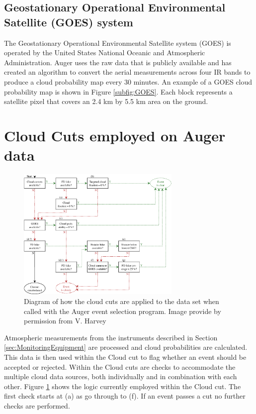 \subsection{Geostationary Operational Environmental Satellite (GOES) system}

The Geostationary Operational Environmental Satellite system (GOES) is operated by the United States National Oceanic and Atmospheric Administration. Auger uses the raw data that is publicly available and has created an algorithm to convert the aerial measurements across four IR bands to produce a cloud probability map every 30 minutes. An example of a GOES cloud probability map is shown in Figure \ref{subfig:GOES}. Each block represents a satellite pixel that covers an 2.4 km by 5.5 km area on the ground.

\section{Cloud Cuts employed on Auger data}

\begin{figure}[!t]
\centering
\includegraphics[width=0.7\textwidth]{chapters/graphs/CloudFlags/cloud_cuts.pdf}
\caption{Diagram of how the cloud cuts are applied to the data set when called with the Auger event selection program. Image provide by permission from V. Harvey} \label{fig:Cloud_Cut_Logic}
\end{figure}

Atmospheric measurements from the instruments described in Section \ref{sec:MonitoringEquipment} are processed and cloud probabilities are calculated. This data is then used within the Cloud cut to flag whether an event should be accepted or rejected. Within the Cloud cuts are checks to accommodate the multiple cloud data sources, both individually and in combination with each other. Figure \ref{fig:Cloud_Cut_Logic} shows the logic currently employed within the Cloud cut. The first check starts at (a) as go through to (f).  If an event passes a cut no further checks are performed.

